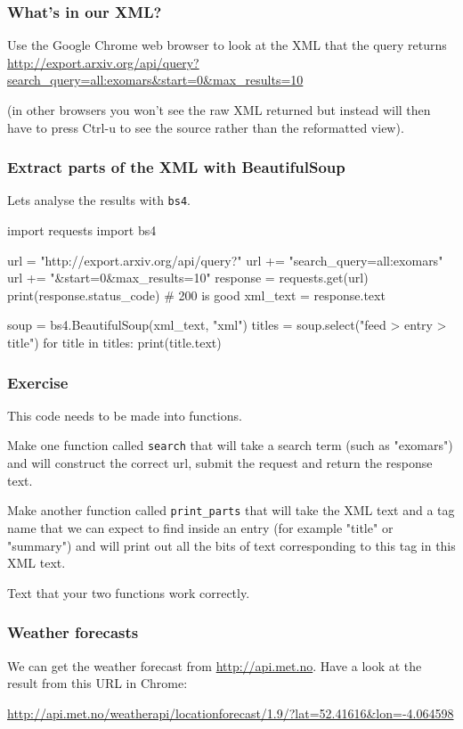 \documentclass{beamer}
\begin{document}
\begin{frame}[fragile]
\frametitle{What's in our XML?}
Use the Google Chrome web browser to look at the XML that the query returns
\url{http://export.arxiv.org/api/query?search_query=all:exomars&start=0&max_results=10}

\bigskip

(in other browsers you won't see the raw XML returned but instead will then have to press Ctrl-u to see the source rather than the reformatted view).
\end{frame}


\begin{frame}[fragile]
\frametitle{Extract parts of the XML with BeautifulSoup}
Lets analyse the results with \texttt{bs4}.
\begin{code}
import requests
import bs4

url = "http://export.arxiv.org/api/query?" 
url += "search_query=all:exomars" 
url += "&start=0&max_results=10"
response = requests.get(url)
print(response.status_code) # 200 is good
xml_text = response.text

soup = bs4.BeautifulSoup(xml_text, "xml")
titles = soup.select("feed > entry > title")
for title in titles:
   print(title.text)
\end{code}
\end{frame}

\begin{frame}[fragile]
\frametitle{Exercise}
This code needs to be made into functions. 

\bigskip

Make one function called \texttt{search} that will take a search term (such as "exomars") and will construct the correct url, submit the request and return the response text.

\bigskip

Make another function called \texttt{print\_parts} that will take the XML text and a tag name that we can expect to find inside an entry (for example "title" or "summary") and will print out all the bits of text corresponding to this tag in this XML text.

\bigskip

Text that your two functions work correctly.
\end{frame}

\begin{frame}[fragile]
\frametitle{Weather forecasts}
We can get the weather forecast from \url{http://api.met.no}. Have a look at the result from this URL in Chrome:

\bigskip

\url{http://api.met.no/weatherapi/locationforecast/1.9/?lat=52.41616&lon=-4.064598}
\end{frame}
\end{document}
